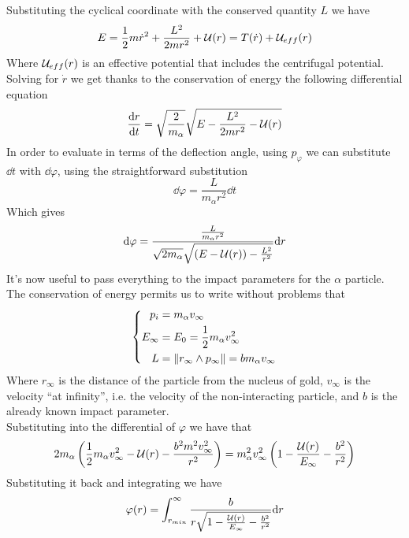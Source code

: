 \documentclass[../qm.tex]{subfiles}
\begin{document}
Substituting the cyclical coordinate with the conserved quantity $L$ we have
\begin{equation}
	E=\frac{1}{2}m\dot{r}^2+\frac{L^2}{2mr^2}+\mathcal{U}(r)=T(\dot{r})+\mathcal{U}_{eff}(r)
	\label{eq:effpotenruth}
\end{equation}
Where $\mathcal{U}_{eff}(r)$ is an effective potential that includes the centrifugal potential.\\
Solving for $\dot{r}$ we get thanks to the conservation of energy the following differential equation
\begin{equation*}
	\dv{r}{t}=\sqrt{\frac{2}{m_\alpha}}\sqrt{E-\frac{L^2}{2mr^2}-\mathcal{U}(r)}
\end{equation*}
In order to evaluate in terms of the deflection angle, using $p_\varphi$ we can substitute $\dd t$ with $\dd\varphi$, using the straightforward substitution
\begin{equation*}
	\dd\varphi=\frac{L}{m_\alpha r^2}\dd t
\end{equation*}
Which gives
\begin{equation*}
	\dd\varphi=\frac{\frac{L}{m_\alpha r^2}}{\sqrt{2m_\alpha}\sqrt{(E-\mathcal{U}(r))-\frac{L^2}{r^2}}}\dd r
\end{equation*}
It's now useful to pass everything to the impact parameters for the $\alpha$ particle.\\
The conservation of energy permits us to write without problems that
\begin{equation}
	\left\{ \begin{aligned}
		p_i&=m_\alpha v_\infty\\
		E_\infty&=E_0=\frac{1}{2}m_\alpha v_\infty^2\\
		L&=\norm{r_\infty\wedge p_\infty}=bm_\alpha v_\infty
\end{aligned}\right.
	\label{eq:impactparruth}
\end{equation}
Where $r_\infty$ is the distance of the particle from the nucleus of gold, $v_\infty$ is the velocity ``at infinity'', i.e. the velocity of the non-interacting particle, and $b$ is the already known impact parameter.\\
Substituting into the differential of $\varphi$ we have that
\begin{equation*}
	2m_\alpha\left( \frac{1}{2}m_\alpha v_\infty^2-\mathcal{U}(r)-\frac{b^2m^2v_\infty^2}{r^2}\right)=m^2_\alpha v^2_\infty\left( 1-\frac{\mathcal{U}(r)}{E_\infty}-\frac{b^2}{r^2} \right)
\end{equation*}
Substituting it back and integrating we have
\begin{equation*}
	\varphi(r)=\int_{r_{min}}^{\infty}\frac{b}{r\sqrt{1-\frac{\mathcal{U}(r)}{E_\infty}-\frac{b^2}{r^2}}}\dd r
\end{equation*}
\end{document}
